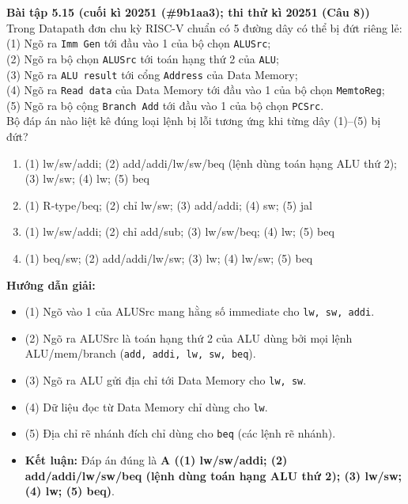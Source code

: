 \textbf{Bài tập 5.15 (cuối kì 20251 (\#9b1aa3); thi thử kì 20251 (Câu 8))}\\
Trong Datapath đơn chu kỳ RISC-V chuẩn có 5 đường dây có thể bị đứt riêng lẻ:\\
(1) Ngõ ra \texttt{Imm Gen} tới đầu vào 1 của bộ chọn \texttt{ALUSrc};\\
(2) Ngõ ra bộ chọn \texttt{ALUSrc} tới toán hạng thứ 2 của \texttt{ALU};\\
(3) Ngõ ra \texttt{ALU result} tới cổng \texttt{Address} của Data Memory;\\
(4) Ngõ ra \texttt{Read data} của Data Memory tới đầu vào 1 của bộ chọn \texttt{MemtoReg};\\
(5) Ngõ ra bộ cộng \texttt{Branch Add} tới đầu vào 1 của bộ chọn \texttt{PCSrc}.\\
Bộ đáp án nào liệt kê đúng loại lệnh bị lỗi tương ứng khi từng dây (1)--(5) bị đứt?
\begin{enumerate}[label=\Alph*.]
    \item (1) lw/sw/addi; (2) add/addi/lw/sw/beq (lệnh dùng toán hạng ALU thứ 2); (3) lw/sw; (4) lw; (5) beq
    \item (1) R-type/beq; (2) chỉ lw/sw; (3) add/addi; (4) sw; (5) jal
    \item (1) lw/sw/addi; (2) chỉ add/sub; (3) lw/sw/beq; (4) lw; (5) beq
    \item (1) beq/sw; (2) add/addi/lw/sw; (3) lw; (4) lw/sw; (5) beq
\end{enumerate}
\textbf{Hướng dẫn giải:}
\begin{itemize}
    \item (1) Ngõ vào 1 của ALUSrc mang hằng số immediate cho \texttt{lw, sw, addi}.
    \item (2) Ngõ ra ALUSrc là toán hạng thứ 2 của ALU dùng bởi mọi lệnh ALU/mem/branch (\texttt{add, addi, lw, sw, beq}).
    \item (3) Ngõ ra ALU gửi địa chỉ tới Data Memory cho \texttt{lw, sw}.
    \item (4) Dữ liệu đọc từ Data Memory chỉ dùng cho \texttt{lw}.
    \item (5) Địa chỉ rẽ nhánh đích chỉ dùng cho \texttt{beq} (các lệnh rẽ nhánh).
    \item \textbf{Kết luận:} Đáp án đúng là \textbf{A ((1) lw/sw/addi; (2) add/addi/lw/sw/beq (lệnh dùng toán hạng ALU thứ 2); (3) lw/sw; (4) lw; (5) beq)}.
\end{itemize}

